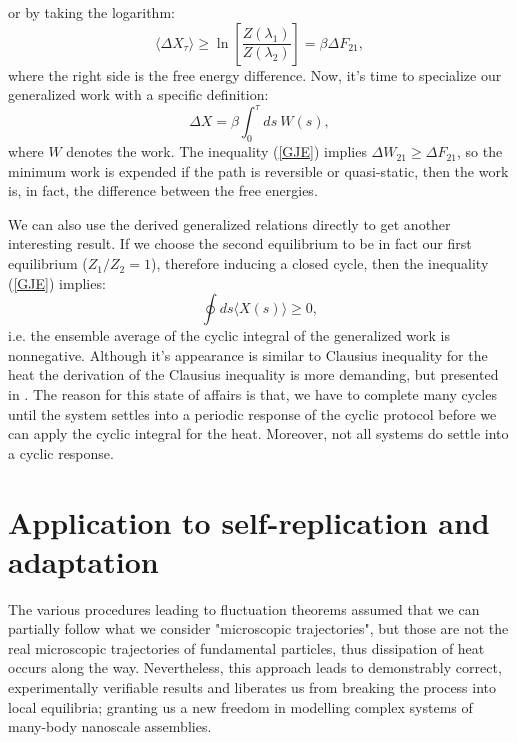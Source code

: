 \documentclass[a4paper,12pt]{article}
\begin{document}
or by taking the logarithm:
\begin{equation}
\label{GJE}
  \langle \Delta X_\tau \rangle \geq \ln\left[\frac{Z(\lambda_1)}{Z(\lambda_2)}\right]=\beta \Delta F_{21},
\end{equation}
where the right side is the free energy difference. Now, it's time to specialize our generalized work with a specific definition:
\begin{equation}
  \Delta X = \beta \int_0^\tau ds\ W(s),
\end{equation}
where $W$ denotes the work. The inequality (\ref{GJE}) implies $\Delta W_{21} \geq \Delta F_{21} $, so the minimum work is expended if the path is reversible or quasi-static, then the work is, in fact, the difference between the free energies.%

We can also use the derived generalized relations directly to get another interesting result. 
If we choose the second equilibrium to be in fact our first equilibrium ($Z_1/Z_2=1$), therefore inducing a closed cycle, then the inequality (\ref{GJE}) implies:
\begin{equation}
\label{CyclicInequalityForGeneralizedWork}
  \oint ds \langle X(s) \rangle \geq 0,
\end{equation}
i.e. the ensemble average of the cyclic integral of the generalized work is nonnegative.
Although it's appearance is similar to Clausius inequality for the heat the derivation of the Clausius inequality is more demanding, but presented in \cite{Evans:2241458}.
The reason for this state of affairs is that, we have to complete many cycles until the system settles into a periodic response of the cyclic protocol before we can apply the cyclic integral for the heat. Moreover, not all systems do settle into a cyclic response.

\section{Application to self-replication and adaptation}
\label{CrooksApplications}

The various procedures leading to fluctuation theorems assumed that we can partially follow what we consider "microscopic trajectories", but those are not the real microscopic trajectories of fundamental particles, thus dissipation of heat occurs along the way. Nevertheless, this approach leads to demonstrably correct, experimentally verifiable results and liberates us from breaking the process into local equilibria; granting us a new freedom in modelling complex systems of many-body nanoscale assemblies.
\end{document}
